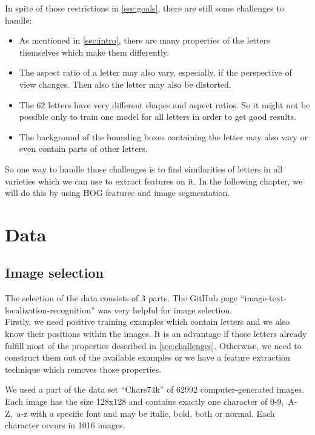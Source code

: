\documentclass[conference]{IEEEtran}
\begin{document}
In spite of those restrictions in \ref{sec:goals}, there are still some challenges to handle:
\begin{itemize}
\item As mentioned in \ref{sec:intro}, there are many properties of the letters themselves which make them differently.
\item The aspect ratio of a letter may also vary, especially, if the perspective of view changes. Then also the letter may also be distorted.
\item The 62 letters have very different shapes and aspect ratios. So it might not be possible only to train one model for all letters in order to get good results.
\item The background of the bounding boxes containing the letter may also vary or even contain parts of other letters.
\end{itemize}
So one way to handle those challenges is to find similarities of letters in all varieties which we can use to extract features on it. In the following chapter, we will do this by using HOG features and image segmentation.

\section{Data}

\subsection{Image selection}\label{sec:img-sel}

The selection of the data consists of 3 parts. The GitHub page ``image-text-localization-recognition'' \cite{bib:github} was very helpful for image selection. \\[-5pt]

Firstly, we need positive training examples which contain letters and we also know their positions within the images. It is an advantage if those letters already fulfill most of the properties described in \ref{sec:challenges}. Otherwise, we need to construct them out of the available examples or we have a feature extraction technique which removes those properties.

We used a part of the data set ``Chars74k'' \cite{bib:chars74k} of 62992 computer-generated images. Each image has the size 128x128 and contains exactly one character of \mbox{0-9, A-Z, a-z} with a specific font and may be italic, bold, both or normal. Each character occurs in 1016 images. \\[-5pt]
\end{document}
